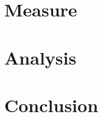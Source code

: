 \documentclass[
    iai, %
    mi, %
]{heig-tb}
\begin{document}
\chapter{Measure}


\chapter{Analysis}


\chapter{Conclusion}


\clearpage
\printbibliography

\appendix
\appendixpage
\addappheadtotoc



\label{glossaire}
\printnoidxglossary
\label{index}
\printindex

% 
\end{document}
